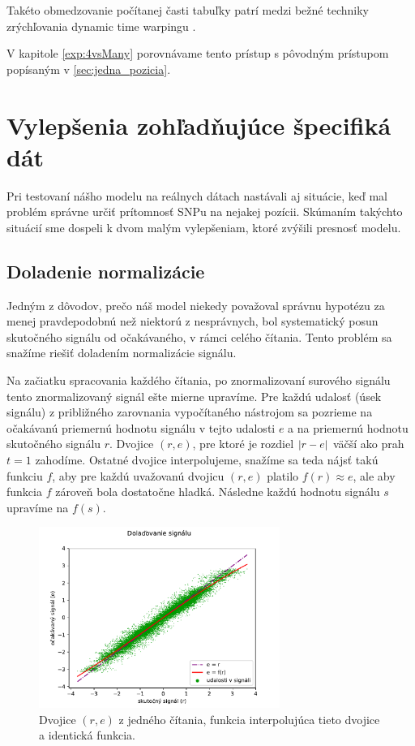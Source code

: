 Takéto obmedzovanie počítanej časti tabuľky patrí medzi bežné techniky zrýchľovania
dynamic time warpingu \cite{FastDTW}.

V kapitole \ref{exp:4vsMany} porovnávame tento prístup s pôvodným prístupom popísaným v \ref{sec:jedna_pozicia}.


\section{Vylepšenia zohľadňujúce špecifiká dát}
\label{sec:vylepsenia}
Pri testovaní nášho modelu na reálnych dátach nastávali aj situácie, keď mal problém správne určiť 
prítomnosť SNPu na nejakej pozícii. Skúmaním takýchto situácií sme dospeli k dvom malým vylepšeniam,
ktoré zvýšili presnosť modelu.

\subsection{Doladenie normalizácie}
\label{upg:tweaking}
Jedným z dôvodov, prečo náš model niekedy považoval správnu hypotézu za menej pravdepodobnú než
niektorú z nesprávnych, bol systematický posun skutočného signálu od očakávaného, v rámci celého
čítania. Tento problém sa snažíme riešiť doladením normalizácie signálu.

Na začiatku spracovania každého čítania, po znormalizovaní surového signálu
 tento znormalizovaný signál ešte mierne upravíme.
Pre každú udalosť (úsek signálu) z približného zarovnania vypočítaného nástrojom \resquiggle{} sa
pozrieme na očakávanú priemernú hodnotu signálu v tejto udalosti $e$ a na priemernú hodnotu skutočného
signálu $r$. Dvojice $(r, e)$, pre ktoré je rozdiel $\abs*{r-e}$ väčší ako prah $t=1$ zahodíme.
Ostatné dvojice interpolujeme, snažíme sa teda nájsť takú funkciu $f$, aby pre každú uvažovanú
dvojicu $(r, e)$ platilo $f(r) \approx e$, ale aby funkcia $f$ zároveň bola dostatočne hladká.
Následne každú hodnotu signálu $s$ upravíme na $f(s)$.

\begin{figure}
\centerline{\includegraphics[width=0.7\textwidth]{plots/signal_tweaking}}
\caption{Dvojice $(r, e)$ z jedného čítania, funkcia interpolujúca tieto dvojice a identická funkcia.}
\label{fig:signal_tweaking}
\end{figure}


